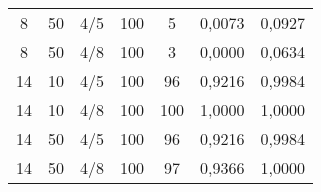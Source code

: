 \begin{table}[H]
\begin{tabular}{ccccccc}
8                                                     & 50                                                        & 4/5 & 100 & 5   & 0,0073        & 0,0927       \\
8                                                     & 50                                                        & 4/8 & 100 & 3   & 0,0000        & 0,0634       \\
14                                                    & 10                                                        & 4/5 & 100 & 96  & 0,9216        & 0,9984       \\
14                                                    & 10                                                        & 4/8 & 100 & 100 & 1,0000        & 1,0000       \\
14                                                    & 50                                                        & 4/5 & 100 & 96  & 0,9216        & 0,9984       \\
14                                                    & 50                                                        & 4/8 & 100 & 97  & 0,9366        & 1,0000      \\ \bottomrule
\end{tabular}
\end{table}



